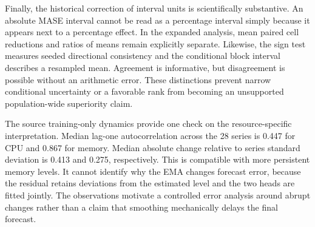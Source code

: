 Finally, the historical correction of interval units is scientifically substantive. An absolute MASE interval cannot be read as a percentage interval simply because it appears next to a percentage effect. In the expanded analysis, mean paired cell reductions and ratios of means remain explicitly separate. Likewise, the sign test measures seeded directional consistency and the conditional block interval describes a resampled mean. Agreement is informative, but disagreement is possible without an arithmetic error. These distinctions prevent narrow conditional uncertainty or a favorable rank from becoming an unsupported population-wide superiority claim.

The source training-only dynamics provide one check on the resource-specific interpretation. Median lag-one autocorrelation across the 28 series is 0.447 for CPU and 0.867 for memory. Median absolute change relative to series standard deviation is 0.413 and 0.275, respectively. This is compatible with more persistent memory levels. It cannot identify why the EMA changes forecast error, because the residual retains deviations from the estimated level and the two heads are fitted jointly. The observations motivate a controlled error analysis around abrupt changes rather than a claim that smoothing mechanically delays the final forecast.
